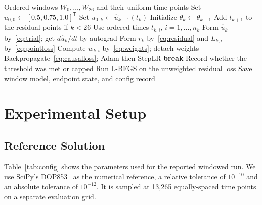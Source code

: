 \documentclass[conference]{IEEEtran}
\begin{document}
\begin{algorithm}[t]
\caption{Sequential window training}
\label{alg:training}
\begin{algorithmic}[1]
\Require Ordered windows $W_0,\ldots,W_{26}$ and their uniform time points
\State Set $u_{0,0}\gets[0.5,0.75,1.0]^\mathsf{T}$
    \State Set $u_{0,k}\gets\hat{u}_{k-1}(t_k)$
    \State Initialize $\theta_k\gets\theta_{k-1}$
  \EndIf
  \State Add $t_{k+1}$ to the residual points if $k<26$
      \State Use ordered times $t_{k,i}$, $i=1,\ldots,n_k$
    \State Form $\hat{u}_k$ by~\eqref{eq:trial}; get $d\hat{u}_k/dt$ by autograd
    \State Form $r_k$ by~\eqref{eq:residual} and $L_{k,i}$ by~\eqref{eq:pointloss}
    \State Compute $w_{k,i}$ by~\eqref{eq:weights}; detach weights
      \State Backpropagate~\eqref{eq:causalloss}; Adam then StepLR
        \State \textbf{break}
      \EndIf
    \EndFor
    \State Record whether the threshold was met or capped
  \EndFor
  \State Run L-BFGS on the unweighted residual loss
  \State Save window model, endpoint state, and config record
\EndFor
\end{algorithmic}
\end{algorithm}



\section{Experimental Setup}

\subsection{Reference Solution}




Table~\ref{tab:config} shows the parameters used for the reported windowed run. We use SciPy’s DOP853~\cite{virtanen2020} as the numerical reference, a relative tolerance of $10^{-10}$ and an absolute tolerance of $10^{-12}$. It is sampled at 13,265 equally-spaced time points on a separate evaluation grid.
\end{document}
